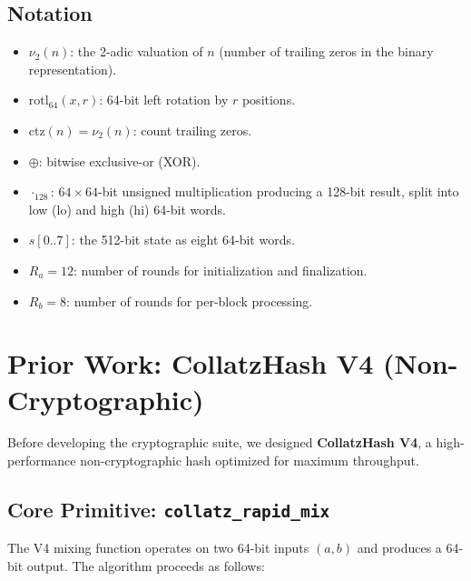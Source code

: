 \documentclass[11pt,a4paper]{article}
\newcommand{\rotl}{\mathrm{rotl}_{64}}
\newcommand{\ctz}{\mathrm{ctz}}
\begin{document}
\subsection{Notation}

\begin{itemize}
    \item $\nu_2(n)$: the 2-adic valuation of $n$ (number of trailing
          zeros in the binary representation).
    \item $\rotl(x, r)$: 64-bit left rotation by $r$ positions.
    \item $\ctz(n) = \nu_2(n)$: count trailing zeros.
    \item $\oplus$: bitwise exclusive-or (XOR).
    \item $\cdot_{128}$: $64 \times 64$-bit unsigned multiplication
          producing a 128-bit result, split into low ($\mathrm{lo}$) and
          high ($\mathrm{hi}$) 64-bit words.
    \item $s[0..7]$: the 512-bit state as eight 64-bit words.
    \item $R_a = 12$: number of rounds for initialization and finalization.
    \item $R_b = 8$: number of rounds for per-block processing.
\end{itemize}

\section{Prior Work: CollatzHash V4 (Non-Cryptographic)}
\label{sec:v4}

Before developing the cryptographic suite, we designed
\textbf{CollatzHash V4}, a high-performance non-cryptographic hash
optimized for maximum throughput.

\subsection{Core Primitive: \texttt{collatz\_rapid\_mix}}

The V4 mixing function operates on two 64-bit inputs $(a, b)$ and
produces a 64-bit output. The algorithm proceeds as follows:
\end{document}
